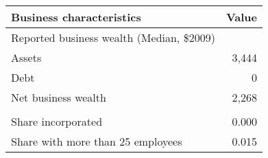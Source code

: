 \begin{tabular}{lr}
\toprule
Business characteristics & \multicolumn{1}{l}{Value} \\
\midrule
Reported business wealth (Median, \$2009) &  \\
\qquad Assets &              3,444  \\
\qquad Debt & 0 \\
\qquad Net business wealth &              2,268  \\
      &  \\
Share incorporated & 0.000 \\
Share with more than 25 employees & 0.015 \\
\bottomrule
\end{tabular}%
